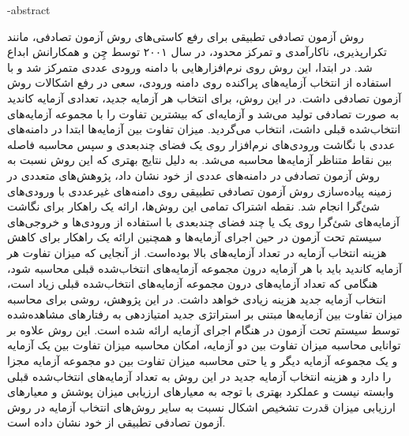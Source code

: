 \fa-abstract{

روش آزمون تصادفی تطبیقی برای رفع کاستی‌های روش آزمون تصادفی، مانند تکرارپذیری، ناکارآمدی و تمرکز محدود، در سال ۲۰۰۱ توسط چِن و همکارانش ابداع شد. در ابتدا، این روش روی نرم‌افزارهایی با دامنه ورودی عددی متمرکز شد و با استفاده از انتخاب آزمایه‌های پراکنده روی دامنه ورودی، سعی در رفع اشکالات روش آزمون تصادفی داشت. 
در این روش، برای انتخاب هر آزمایه جدید، تعدادی آزمایه کاندید به صورت تصادفی تولید می‌شد و آزمایه‌ای که بیشترین تفاوت را با مجموعه آزمایه‌های انتخاب‌شده قبلی داشت، انتخاب می‌گردید. میزان تفاوت بین آزمایه‌ها ابتدا در دامنه‌های عددی با نگاشت ورودی‌های نرم‌افزار روی یک فضای چندبعدی و سپس محاسبه فاصله بین نقاط متناظر آزمایه‌ها محاسبه می‌شد.
به دلیل نتایج بهتری که این روش نسبت به روش آزمون تصادفی در دامنه‌های عددی از خود نشان داد، پژوهش‌های متعددی در زمینه پیاده‌سازی روش آزمون تصادفی تطبیقی روی دامنه‌های غیرعددی با ورودی‌های شئ‌گرا انجام شد. نقطه اشتراک تمامی این روش‌ها، ارائه یک راهکار برای نگاشت آزمایه‌های شئ‌گرا روی یک یا چند فضای چندبعدی با استفاده از ورودی‌ها و خروجی‌های سیستم تحت آزمون در حین اجرای آزمایه‌ها و همچنین ارائه یک راهکار برای کاهش هزینه انتخاب آزمایه در تعداد آزمایه‌های بالا بوده‌است. از آنجایی که میزان تفاوت هر آزمایه کاندید باید با هر آزمایه درون مجموعه آزمایه‌های انتخاب‌شده قبلی محاسبه شود، هنگامی که تعداد آزمایه‌های درون مجموعه آزمایه‌های انتخاب‌شده قبلی زیاد است، انتخاب آزمایه جدید هزینه زیادی خواهد داشت.
در این پژوهش، روشی برای محاسبه میزان تفاوت بین آزمایه‌ها مبتنی بر استراتژی جدید امتیازدهی به رفتارهای مشاهده‌شده توسط سیستم تحت آزمون در هنگام اجرای آزمایه ارائه شده است. این روش علاوه بر توانایی محاسبه میزان تفاوت بین دو آزمایه، امکان محاسبه میزان تفاوت بین یک آزمایه و یک مجموعه آزمایه دیگر و یا حتی محاسبه میزان تفاوت بین دو مجموعه آزمایه مجزا را دارد و هزینه انتخاب آزمایه جدید در این روش به تعداد آزمایه‌های انتخاب‌شده قبلی وابسته نیست و عملکرد بهتری با توجه به معیارهای ارزیابی میزان پوشش و معیارهای ارزیابی میزان قدرت تشخیص اشکال نسبت به سایر روش‌های انتخاب آزمایه در روش آزمون تصادفی تطبیقی از خود نشان داده است.
}

